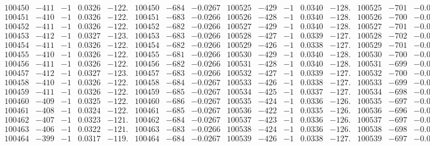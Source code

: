 \documentclass[11pt,reqno,a4letter]{article}
\numberwithin{figure}{section}
\numberwithin{table}{section}
\theoremstyle{plain}
\numberwithin{theorem}{section}
\theoremstyle{definition}
\begin{document}
\begin{table}[ht!]
\begin{equation*}
{\begin{array}{ccccc|ccc||ccccc|ccc}
100450 & -411 & -1 & 0.0326 & -122. & 100450 & -684 & -0.0267 & 100525 & -429 & -1 & 0.0340 & -128. & 100525 & -701 & -0.0273  \\
100451 & -410 & -1 & 0.0326 & -122. & 100451 & -683 & -0.0266 & 100526 & -428 & -1 & 0.0340 & -128. & 100526 & -700 & -0.0273  \\
100452 & -411 & -1 & 0.0326 & -122. & 100452 & -682 & -0.0266 & 100527 & -429 & -1 & 0.0340 & -128. & 100527 & -701 & -0.0273  \\
100453 & -412 & -1 & 0.0327 & -123. & 100453 & -683 & -0.0266 & 100528 & -427 & -1 & 0.0339 & -127. & 100528 & -702 & -0.0274  \\
100454 & -411 & -1 & 0.0326 & -122. & 100454 & -682 & -0.0266 & 100529 & -426 & -1 & 0.0338 & -127. & 100529 & -701 & -0.0273  \\
100455 & -410 & -1 & 0.0326 & -122. & 100455 & -681 & -0.0266 & 100530 & -429 & -1 & 0.0340 & -128. & 100530 & -700 & -0.0273  \\
100456 & -411 & -1 & 0.0326 & -122. & 100456 & -682 & -0.0266 & 100531 & -428 & -1 & 0.0340 & -128. & 100531 & -699 & -0.0272  \\
100457 & -412 & -1 & 0.0327 & -123. & 100457 & -683 & -0.0266 & 100532 & -427 & -1 & 0.0339 & -127. & 100532 & -700 & -0.0273  \\
100458 & -410 & -1 & 0.0326 & -122. & 100458 & -684 & -0.0267 & 100533 & -426 & -1 & 0.0338 & -127. & 100533 & -699 & -0.0272  \\
100459 & -411 & -1 & 0.0326 & -122. & 100459 & -685 & -0.0267 & 100534 & -425 & -1 & 0.0337 & -127. & 100534 & -698 & -0.0272  \\
100460 & -409 & -1 & 0.0325 & -122. & 100460 & -686 & -0.0267 & 100535 & -424 & -1 & 0.0336 & -126. & 100535 & -697 & -0.0272  \\
100461 & -408 & -1 & 0.0324 & -122. & 100461 & -685 & -0.0267 & 100536 & -422 & -1 & 0.0335 & -126. & 100536 & -696 & -0.0271  \\
100462 & -407 & -1 & 0.0323 & -121. & 100462 & -684 & -0.0267 & 100537 & -423 & -1 & 0.0336 & -126. & 100537 & -697 & -0.0272  \\
100463 & -406 & -1 & 0.0322 & -121. & 100463 & -683 & -0.0266 & 100538 & -424 & -1 & 0.0336 & -126. & 100538 & -698 & -0.0272  \\
100464 & -399 & -1 & 0.0317 & -119. & 100464 & -684 & -0.0267 & 100539 & -426 & -1 & 0.0338 & -127. & 100539 & -697 & -0.0272  \\
\end{array}
}
\end{equation*} 

\end{table}
\clearpage 
\end{document}
